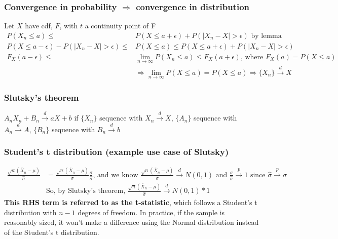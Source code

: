 \documentclass{article}
\newcommand{\abs}[1]{\lvert#1\rvert}
\begin{document}
\subsubsection{Convergence in probability $\Longrightarrow$ convergence in distribution}
Let $X$ have cdf, $F$, with $t$ a continuity point of F
\begin{align*}
    P(X_n \leq a) \leq& P(X \leq a + \epsilon) + P( \abs{X_n - X} > \epsilon) \textrm{ by lemma}\\
    P(X \leq a - \epsilon) - P(\abs{X_n - X} > \epsilon) \leq& P(X \leq a) \leq P(X \leq a + \epsilon) + P(\abs{X_n - X} > \epsilon)\\
    F_X(a - \epsilon) \leq& \lim_{n\rightarrow \infty} P(X_n \leq a) \leq F_X(a + \epsilon) \textrm{, where } F_X(a) = P(X \leq a)\\
    &\Longrightarrow \lim_{n \rightarrow \infty} P(X \leq a) = P(X \leq a) \Longrightarrow \{X_n \} \overset{d}{\longrightarrow} X
\end{align*}

\subsubsection{Slutsky's theorem}
$A_nX_n + B_n \overset{d}{\rightarrow} aX + b$ if $\{X_n\}$ sequence with $X_n \overset{d}{\rightarrow} X$,  $\{A_n\}$ sequence with $A_n \overset{d}{\rightarrow} A$,   $\{B_n\}$ sequence with $B_n \overset{d}{\rightarrow} b$


\subsubsection{Student's t distribution (example use case of Slutsky)} 
\begin{align*}
    \frac{\sqrt{n}(\bar{X}_n - \mu)}{\hat{\sigma}} &= \frac{\sqrt{n}(\bar{X}_n - \mu)}{\sigma} \frac{\sigma}{\hat{\sigma}}
    \textrm{, and we know } \frac{\sqrt{n}(\bar{X}_n - \mu)}{\sigma} \overset{d}{\longrightarrow} N(0, 1)\textrm{ and } \frac{\sigma}{\hat{\sigma}} \overset{p}{\longrightarrow} 1 \textrm{ since } \hat{\sigma} \overset{p}{\longrightarrow} \sigma\\
    &\textrm{So, by Slutsky's theorem, } \frac{\sqrt{n}(\bar{X}_n - \mu)}{\hat{\sigma}} \overset{d}{\longrightarrow} N(0, 1) * 1
\end{align*}
\textbf{This RHS term is referred to as the t-statistic}, which follows a Student's t distribution with $n-1$ degrees of freedom. In practice, if the sample is reasonably sized, it won't make a difference using the Normal distribution instead of the Student's t distribution. 
\end{document}
